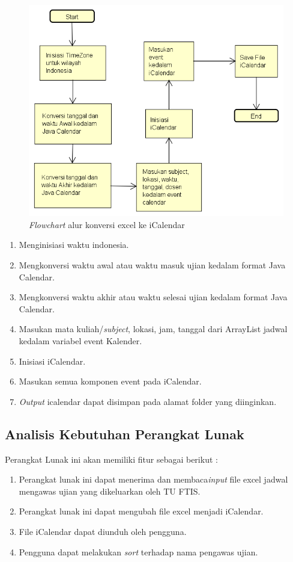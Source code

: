 \begin{figure}[H]
	\centering
	\includegraphics[scale=0.6]{Gambar/FlowchartConvertiCalendar}
	\caption{\textit{Flowchart} alur konversi excel ke iCalendar}
	\label{fig:flowchartKonversiiCalendar}
	\end{figure}
\begin{enumerate}
	\item Menginisiasi waktu indonesia.
	\item Mengkonversi waktu awal atau waktu masuk ujian kedalam format Java Calendar.
	\item Mengkonversi waktu akhir atau waktu selesai ujian kedalam format Java Calendar.
	\item Masukan mata kuliah/\textit{subject}, lokasi, jam, tanggal dari ArrayList jadwal kedalam variabel event Kalender.
	\item Inisiasi iCalendar.
	\item Masukan semua komponen event pada iCalendar.
	\item \textit{Output} icalendar dapat disimpan pada alamat folder yang diinginkan.
\end{enumerate}

\subsection{Analisis Kebutuhan Perangkat Lunak}
Perangkat Lunak ini akan memiliki fitur sebagai berikut : 
	\begin{enumerate}
		\item Perangkat lunak ini dapat menerima dan membaca\textit{input} file excel jadwal mengawas ujian yang dikeluarkan oleh TU FTIS.
		\item Perangkat lunak ini dapat mengubah file excel menjadi iCalendar.
		\item File iCalendar dapat diunduh oleh pengguna.
		\item Pengguna dapat melakukan \textit{sort} terhadap nama pengawas ujian.
	\end{enumerate}

